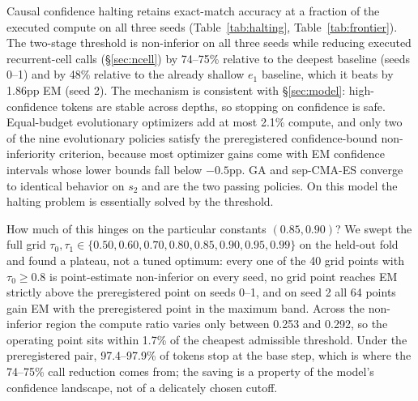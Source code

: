 ﻿\documentclass[11pt]{article}
\begin{document}
Causal confidence halting retains exact-match accuracy at a fraction of the executed compute on all three seeds (Table~\ref{tab:halting}, Table~\ref{tab:frontier}). The two-stage threshold is non-inferior on all three seeds while reducing executed recurrent-cell calls (\S\ref{sec:ncell}) by 74--75\% relative to the deepest baseline (seeds 0--1) and by 48\% relative to the already shallow $e_1$ baseline, which it beats by 1.86pp EM (seed 2). The mechanism is consistent with \S\ref{sec:model}: high-confidence tokens are stable across depths, so stopping on confidence is safe. Equal-budget evolutionary optimizers add at most 2.1\% compute, and only two of the nine evolutionary policies satisfy the preregistered confidence-bound non-inferiority criterion, because most optimizer gains come with EM confidence intervals whose lower bounds fall below $-0.5$pp. GA and sep-CMA-ES converge to identical behavior on $s_2$ and are the two passing policies. On this model the halting problem is essentially solved by the threshold.

How much of this hinges on the particular constants $(0.85, 0.90)$? We swept the full grid $\tau_0, \tau_1 \in \{0.50, 0.60, 0.70, 0.80, 0.85, 0.90, 0.95, 0.99\}$ on the held-out fold and found a plateau, not a tuned optimum: every one of the 40 grid points with $\tau_0 \geq 0.8$ is point-estimate non-inferior on every seed, no grid point reaches EM strictly above the preregistered point on seeds 0--1, and on seed 2 all 64 points gain EM with the preregistered point in the maximum band. Across the non-inferior region the compute ratio varies only between 0.253 and 0.292, so the operating point sits within 1.7\% of the cheapest admissible threshold. Under the preregistered pair, 97.4--97.9\% of tokens stop at the base step, which is where the 74--75\% call reduction comes from; the saving is a property of the model's confidence landscape, not of a delicately chosen cutoff.
\end{document}
